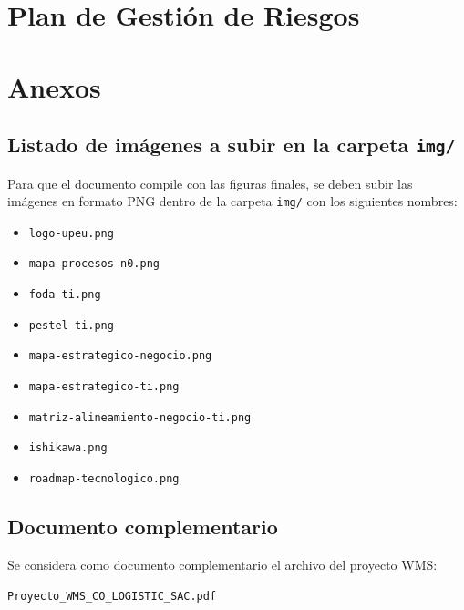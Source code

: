 \documentclass[11pt, a4paper, oneside]{report}
\begin{document}
\chapter{Plan de Gestión de Riesgos}



\appendix
\chapter{Anexos}

\section*{Listado de imágenes a subir en la carpeta \texttt{img/}}

Para que el documento compile con las figuras finales, se deben subir las imágenes en formato PNG dentro de la carpeta \texttt{img/} con los siguientes nombres:

\begin{itemize}
  \item \texttt{logo-upeu.png}
  \item \texttt{mapa-procesos-n0.png}
  \item \texttt{foda-ti.png}
  \item \texttt{pestel-ti.png}
  \item \texttt{mapa-estrategico-negocio.png}
  \item \texttt{mapa-estrategico-ti.png}
  \item \texttt{matriz-alineamiento-negocio-ti.png}
  \item \texttt{ishikawa.png}
  \item \texttt{roadmap-tecnologico.png}
\end{itemize}

\section*{Documento complementario}

Se considera como documento complementario el archivo del proyecto WMS:

\begin{center}
\texttt{Proyecto\_WMS\_CO\_LOGISTIC\_SAC.pdf}
\end{center}
\end{document}

